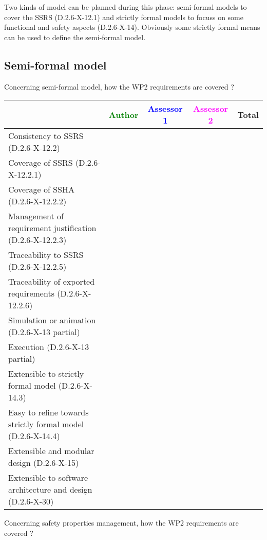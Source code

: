 Two kinds of model can be planned during this phase: semi-formal models to  cover the SSRS (D.2.6-X-12.1) and strictly formal  models to  focuss on some functional and safety aspects (D.2.6-X-14).  Obviously some strictly  formal means can be used to define the semi-formal  model.

\subsection{Semi-formal model}

Concerning semi-formal model, how the WP2 requirements are covered ?

\begin{tabular}{|l | c | c | c | c|}
\hline
& \textcolor{green}{Author} & \textcolor{blue}{Assessor 1} & \textcolor{magenta}{Assessor 2} & Total \\
\hline 
Consistency to SSRS (D.2.6-X-12.2) & & & &  \\
\hline
Coverage of SSRS (D.2.6-X-12.2.1)  & & & &  \\
\hline
Coverage of SSHA (D.2.6-X-12.2.2)  & & & &  \\
\hline
Management of requirement justification (D.2.6-X-12.2.3)  & & & &  \\
\hline
Traceability to  SSRS (D.2.6-X-12.2.5)  & & & &  \\
\hline
Traceability of exported requirements (D.2.6-X-12.2.6)  & & & &  \\
\hline
Simulation or animation (D.2.6-X-13 partial)  & & & &  \\
\hline
Execution (D.2.6-X-13 partial)  & & & &  \\
\hline
Extensible to strictly formal model (D.2.6-X-14.3) & & & &  \\
\hline
Easy to  refine towards strictly formal model (D.2.6-X-14.4) & & & &  \\
\hline
Extensible and modular design (D.2.6-X-15)  & & & &  \\
\hline
Extensible to software architecture and design (D.2.6-X-30)   & & & &  \\
\hline
\end{tabular}

Concerning safety properties management, how the WP2 requirements are covered ?

